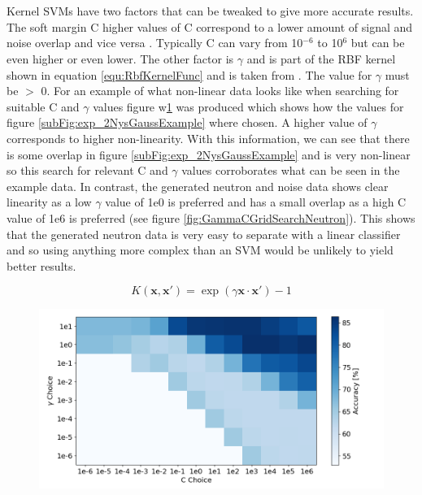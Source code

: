 \\\\Kernel SVMs have two factors that can be tweaked to give more accurate results. The soft margin C higher values of C correspond to a lower amount of signal and noise overlap and vice versa \cite{cortes1995support}. Typically C can vary from 10$^{-6}$ to 10$^6$ but can be even higher or even lower. The other factor is $\gamma$ and is part of the RBF kernel shown in equation \ref{equ:RbfKernelFunc} and is taken from \cite{Boser92atraining}. The value for $\gamma$ must be $>$ 0. For an example of what non-linear data looks like when searching for suitable C and $\gamma$ values figure w\ref{fig:GammaCGridSearchExp2Gauss} was produced which shows how the values for figure \ref{subFig:exp_2NysGaussExample} where chosen. A higher value of $\gamma$ corresponds to higher non-linearity. With this information, we can see that there is some overlap in figure \ref{subFig:exp_2NysGaussExample} and is very non-linear so this search for relevant C and $\gamma$ values corroborates what can be seen in the example data. In contrast, the generated neutron and noise data shows clear linearity as a low $\gamma$ value of 1e0 is preferred and has a small overlap as a high C value of 1e6 is preferred (see figure \ref{fig:GammaCGridSearchNeutron}). This shows that the generated neutron data is very easy to separate with a linear classifier and so using anything more complex than an SVM would be unlikely to yield better results.

\begin{equation}
K(\mathbf{x,x'}) = \exp{(\gamma \mathbf{x \cdot x'})} - 1
\label{equ:RbfKernelFunc}
\end{equation}

\begin{figure}[!h]
\centering
\includegraphics[width=0.9\linewidth]{Chapter4/Figs/Raster/GammaCGridSearchExp2Gauss.png}
\label{fig:GammaCGridSearchExp2Gauss}
\end{figure}

